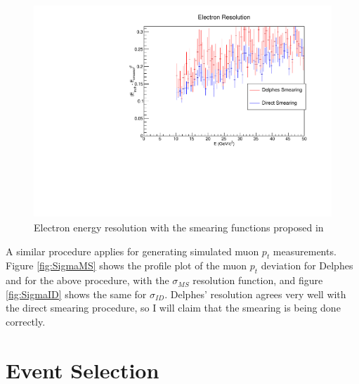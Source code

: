 \documentclass[10pt]{ucscthesisbs}
\begin{document}
\begin{figure}
\includegraphics[height=8cm]{images/ElectronSmearing}
\caption{Electron energy resolution with the smearing functions proposed in \cite{ATLASElectronRes}}
\label{fig:SigmaElectron}
\end{figure}
A similar procedure applies for generating simulated muon $p_t$ measurements. Figure \ref{fig:SigmaMS} shows the profile plot of the muon $p_t$ deviation for Delphes and for the above procedure, with the $\sigma_{MS}$ resolution function, and figure \ref{fig:SigmaID} shows the same for $\sigma_{ID}$. Delphes' resolution agrees very well with the direct smearing procedure, so I will claim that the smearing is being done correctly.


\section{Event Selection}
\end{document}
